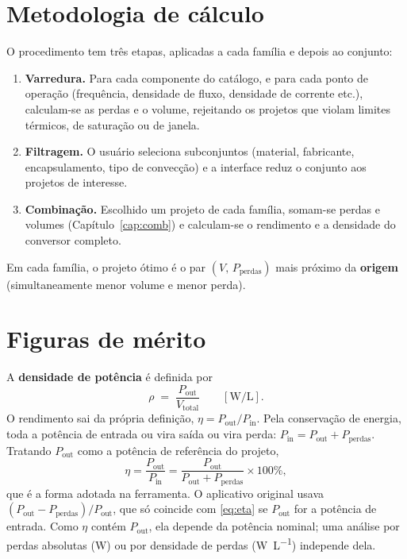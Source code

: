 \documentclass[
	a4paper, 12pt,
	chapter=TITLE, section=Title, subsection=Title,
	oneside, english, brazil, fleqn
]{abntex2}
\begin{document}
\section{Metodologia de cálculo}
O procedimento tem três etapas, aplicadas a cada família e depois ao conjunto:
\begin{enumerate}
	\item \textbf{Varredura.} Para cada componente do catálogo, e para cada ponto
	de operação (frequência, densidade de fluxo, densidade de corrente etc.),
	calculam-se as perdas e o volume, rejeitando os projetos que violam limites
	térmicos, de saturação ou de janela.
	\item \textbf{Filtragem.} O usuário seleciona subconjuntos (material,
	fabricante, encapsulamento, tipo de convecção) e a interface reduz o conjunto
	aos projetos de interesse.
	\item \textbf{Combinação.} Escolhido um projeto de cada família, somam-se
	perdas e volumes (Capítulo~\ref{cap:comb}) e calculam-se o rendimento e a
	densidade do conversor completo.
\end{enumerate}
Em cada família, o projeto ótimo é o par $(V,\,P_{\mathrm{perdas}})$ mais próximo
da \textbf{origem} (simultaneamente menor volume e menor perda).

\section{Figuras de mérito}
A \textbf{densidade de potência} é definida por
\begin{equation}
	\rho \;=\; \frac{P_{\mathrm{out}}}{V_{\mathrm{total}}}\qquad[\si{\watt\per\liter}].
	\label{eq:rho}
\end{equation}
O rendimento sai da própria definição, $\eta=P_{\mathrm{out}}/P_{\mathrm{in}}$.
Pela conservação de energia, toda a potência de entrada ou vira saída ou vira
perda: $P_{\mathrm{in}}=P_{\mathrm{out}}+P_{\mathrm{perdas}}$. Tratando
$P_{\mathrm{out}}$ como a potência de referência do projeto,
\begin{equation}
	\eta=\frac{P_{\mathrm{out}}}{P_{\mathrm{in}}}
	    =\frac{P_{\mathrm{out}}}{P_{\mathrm{out}}+P_{\mathrm{perdas}}}\times100\%,
	\label{eq:eta}
\end{equation}
que é a forma adotada na ferramenta. O aplicativo original usava
$(P_{\mathrm{out}}-P_{\mathrm{perdas}})/P_{\mathrm{out}}$, que só coincide com
\eqref{eq:eta} se $P_{\mathrm{out}}$ for a potência de entrada.
Como $\eta$ contém $P_{\mathrm{out}}$, ela depende da potência nominal; uma
análise por perdas absolutas (\si{\watt}) ou por densidade de perdas
(\si{\watt\per\liter}) independe dela.
\end{document}
